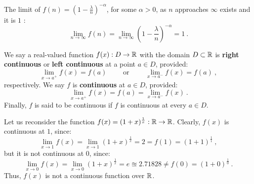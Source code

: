 \begin{example}\label{EX:Limit1MinusLambdaOverNToMinusK} 
The limit of $f(n)=\left( 1-\frac{\lambda}{n} \right)^{-\alpha}$, for some $\alpha>0$, as $n$ approaches $\infty$ exists and it is $1$ :
\[
\lim_{n \to \infty} f(n) = \lim_{n \to \infty} \left( 1-\frac{\lambda}{n} \right)^{-\alpha} = 1 \ .
\]
\end{example}

\begin{definition}
We say a real-valued function $f(x):D \to \mathbb{R}$ with the domain $D \subset \mathbb{R}$ is {\bf right continuous} or {\bf left continuous} at a point $a \in D$, provided:
\[
\lim_{x \to a^+} f(x) = f(a) \qquad \text{ or } \qquad 
\lim_{x \to a^-} f(x) = f(a) \ ,
\]
respectively.  We say $f$ is {\bf continuous} at $a \in D$, provided:
\[
\lim_{x \to a^+} f(x) = f(a) =
\lim_{x \to a^-} f(x) \ .
\]
Finally, $f$ is said to be continuous if $f$ is continuous at every $a \in D$.
\end{definition}
\begin{example}[Discontinuity of $f(x)=(1+x)^{\frac{1}{x}}$ at $0$]
Let us reconsider the function $f(x)=(1+x)^{\frac{1}{x}}:\mathbb{R} \to \mathbb{R}$.  Clearly, $f(x)$ is continuous at $1$, since:
\[
\lim_{x \to 1} f(x) = \lim_{x \to 1}(1+x)^{\frac{1}{x}} = 2 = f(1)=(1+1)^{\frac{1}{1}} \ ,
\]
but it is not continuous at $0$, since:
\[
\lim_{x \to 0} f(x) = \lim_{x \to 0} (1+x)^{\frac{1}{x}} = e \approxeq 2.71828 \neq f(0) = (1+0)^{\frac{1}{0}} \ .
\]
Thus, $f(x)$ is not a continuous function over $\mathbb{R}$.
\end{example}




